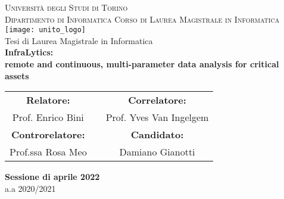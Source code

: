 \begin{titlepage}
    \thispagestyle{empty}
    \begin{center}
        \LARGE{\textsc{Università degli Studi di Torino}}                               \\
        \Large{\textsc{Dipartimento di Informatica}}
        \vskip 20pt
        \large{\textsc{Corso di Laurea Magistrale in Informatica}}                      \\
        \vskip 20pt
        \texttt{[image: unito\_logo]}                                         \\
        \vskip 10pt
        \large{Tesi di Laurea Magistrale in Informatica}                                \\
        \vskip 50pt
        \LARGE{\textbf{InfraLytics:}}                                                   \\
        \LARGE{\textbf{remote and continuous, multi-parameter data analysis for critical assets}}  \\
        \vskip 50pt
        \begin{tabularx}{\textwidth}{cXc}
            \Large{\textbf{Relatore:}}          &   &\Large{\textbf{Correlatore:}}    \\
            \Large{Prof. Enrico Bini}           &   &\Large{Prof. Yves Van Ingelgem}  \\
            \Large{\textbf{Controrelatore:}}    &   &\Large{\textbf{Candidato:}}      \\
            \Large{Prof.ssa Rosa Meo}           &   &\Large{Damiano Gianotti}         \\
        \end{tabularx}
        \vskip 20pt
        \vskip 40pt
        \textbf{Sessione di aprile 2022}                                               \\
        a.a 2020/2021
    \end{center}
\end{titlepage}
\cleardoublepage 